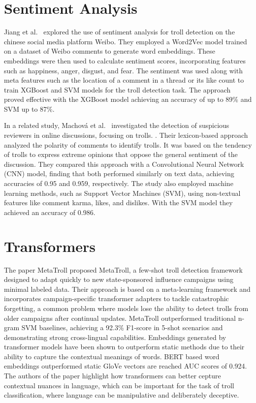 \documentclass[twoside]{ctuthesis}
\theoremstyle{plain}
\theoremstyle{definition}
\theoremstyle{note}
\begin{document}
\section{Sentiment Analysis}
Jiang et al.~\cite{Jiang2021Sentiment} explored the use of sentiment analysis for troll detection on the chinese social media platform Weibo.  They employed a Word2Vec model trained on a dataset of Weibo comments to generate word embeddings. These embeddings were then used to calculate sentiment scores, incorporating features such as happiness, anger, disgust, and fear. The sentiment was used along with meta features such as the location of a comment in a thread or its like count to train XGBoost and SVM models for the troll detection task. The approach proved effective with the XGBoost model achieving an accuracy of up to 89\% and SVM up to 87\%.\par
In a related study, Machová et al.~\cite{Machova2022Comparison} investigated the detection of suspicious reviewers in online discussions, focusing on trolls. . Their lexicon-based approach analyzed the polarity of comments to identify trolls. It was based on the tendency of trolls to express extreme opinions that oppose the general sentiment of the discussion. They compared this approach with a Convolutional Neural Network (CNN) model, finding that both performed similarly on text data, achieving accuracies of 0.95 and 0.959, respectively.  The study also employed machine learning methods, such as Support Vector Machines (SVM), using non-textual features like comment karma, likes, and dislikes. With the SVM model they achieved an accuracy of 0.986.

\section{Transformers}
The paper MetaTroll proposed MetaTroll, a few-shot troll detection framework designed to adapt quickly to new state-sponsored influence campaigns using minimal labeled data. Their approach is based on a meta-learning framework and incorporates campaign-specific transformer adapters to tackle catastrophic forgetting, a common problem where models lose the ability to detect trolls from older campaigns after continual updates. MetaTroll outperformed traditional n-gram SVM baselines, achieving a 92.3\% F1-score in 5-shot scenarios and demonstrating strong cross-lingual capabilities.\cite{Tian2023}
Embeddings generated by transformer models have been shown to outperform static methods due to their ability to capture the contextual meanings of words. BERT based word embeddings outperformed static GloVe vectors are reached AUC scores of 0.924. The authors of the paper \cite{yilmaz2023} highlight how transformers can better cepture contextual nuances in language, which can be important for the task of troll classification, where language can be manipulative and deliberately deceptive.
\end{document}
